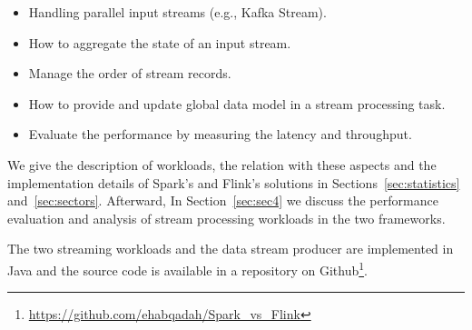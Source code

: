 \documentclass[]{article}
\begin{document}
\begin{itemize}
\item Handling parallel input streams (e.g., Kafka Stream).
\item How to aggregate the state of an input stream.
\item Manage the order of stream records.
\item How to provide and update global data model in a stream processing task.
\item Evaluate the performance by measuring the latency and throughput.
\end{itemize}
We give the description of workloads, the relation with these aspects and  the implementation details of Spark's and Flink's solutions in Sections~\ref{sec:statistics} and~\ref{sec:sectors}. Afterward, In Section~\ref{sec:sec4} we discuss the performance evaluation and analysis of stream processing workloads in the two frameworks. 
\par The two streaming workloads and the data stream producer are implemented in Java and the source code is available in a repository on Github\footnote{\url{https://github.com/ehabqadah/Spark_vs_Flink}}. 
\end{document}
